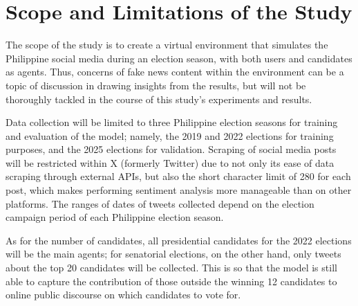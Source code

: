 \section{Scope and Limitations of the Study}
The scope of the study is to create a virtual environment that simulates the Philippine social media during an election season, with both users and candidates as agents. Thus, concerns of fake news content within the environment can be a topic of discussion in drawing insights from the results, but will not be thoroughly tackled in the course of this study’s experiments and results.

Data collection will be limited to three Philippine election seasons for training and evaluation of the model; namely, the 2019 and 2022 elections for training purposes, and the 2025 elections for validation. Scraping of social media posts will be restricted within X (formerly Twitter) due to not only its ease of data scraping through external APIs, but also the short character limit of 280 for each post, which makes performing sentiment analysis more manageable than on other platforms. The ranges of dates of tweets collected depend on the election campaign period of each Philippine election season.

As for the number of candidates, all presidential candidates for the 2022 elections will be the main agents; for senatorial elections, on the other hand, only tweets about the top 20 candidates will be collected. This is so that the model is still able to capture the contribution of those outside the winning 12 candidates to online public discourse on which candidates to vote for.
